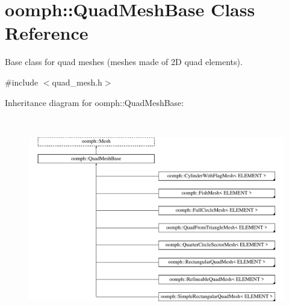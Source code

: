 \hypertarget{classoomph_1_1QuadMeshBase}{}\section{oomph\+:\+:Quad\+Mesh\+Base Class Reference}
\label{classoomph_1_1QuadMeshBase}


Base class for quad meshes (meshes made of 2D quad elements).  




{\ttfamily \#include $<$quad\+\_\+mesh.\+h$>$}

Inheritance diagram for oomph\+:\+:Quad\+Mesh\+Base\+:\begin{figure}[H]
\begin{center}
\leavevmode
\includegraphics[height=8.974360cm]{classoomph_1_1QuadMeshBase}
\end{center}
\end{figure}
